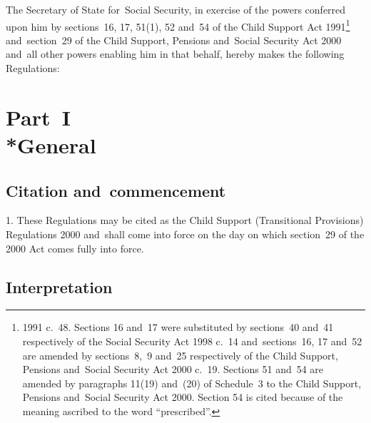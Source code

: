 \documentclass[12pt,a4paper]{article}
\title{\regstitle}
\author{S.I. 2000 No.~3186}
\date{Made 4th December 2000\\Laid before Parliament 6th December 2000\\Coming into force as provided in regulation~1(1)}
\begin{document}
\maketitle

\noindent
The Secretary of State for~Social Security, in exercise of the powers conferred upon him by sections~16, 17, 51(1), 52 and~54 of the Child Support Act 1991\footnote{1991 c.\ 48. Sections 16 and~17 were substituted by sections~40 and~41 respectively of the Social Security Act 1998 c.\ 14 and~sections~16, 17 and~52 are amended by sections~8,~9 and~25 respectively of the Child Support, Pensions and~Social Security Act 2000 c.~19. Sections 51 and~54 are amended by paragraphs 11(19) and~(20) of Schedule~3 to the Child Support, Pensions and~Social Security Act 2000. Section 54 is cited because of the meaning ascribed to the word “prescribed”.} and~section~29 of the Child Support, Pensions and~Social Security Act 2000 and~all other powers enabling him in that behalf, hereby makes the following Regulations: 

{\sloppy

\tableofcontents

}

\bigskip

\setcounter{secnumdepth}{-2}

\pagebreak[3]

\section[Part~I --- General]{Part~I\\*General}

\renewcommand\parthead{--- Part~I}

\subsection[1. Citation and~commencement]{Citation and~commencement}

1.  These Regulations may be cited as the Child Support (Transitional Provisions) Regulations 2000 and~shall come into force on the day on which section~29 of the 2000 Act comes fully into force.

\subsection[2. Interpretation]{Interpretation}
\end{document}
